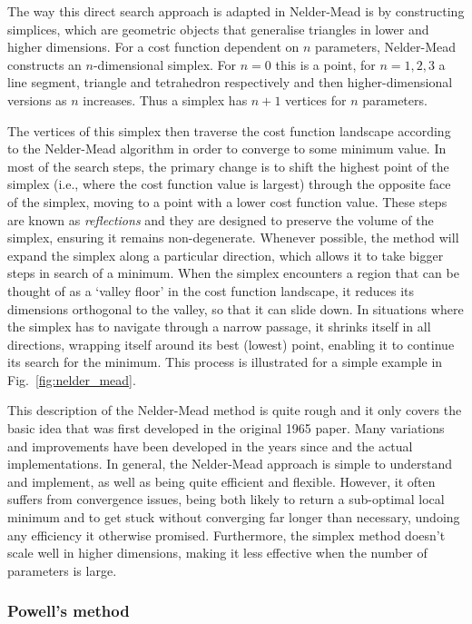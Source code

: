 The way this direct search approach is adapted in Nelder-Mead is by constructing simplices, which are geometric objects that generalise triangles in lower and higher dimensions. For a cost function dependent on $n$ parameters, Nelder-Mead constructs an $n$-dimensional simplex. For $n=0$ this is a point, for $n=1,2,3$ a line segment, triangle and tetrahedron respectively and then higher-dimensional versions as $n$ increases. Thus a simplex has $n+1$ vertices for $n$ parameters. 

The vertices of this simplex then traverse the cost function landscape according to the Nelder-Mead algorithm in order to converge to some minimum value.  In most of the search steps, the primary change is to shift the highest point of the simplex (i.e., where the cost function value is largest) through the opposite face of the simplex, moving to a point with a lower cost function value. These steps are known as \emph{reflections} and they are designed to preserve the volume of the simplex, ensuring it remains non-degenerate. Whenever possible, the method will expand the simplex along a particular direction, which allows it to take bigger steps in search of a minimum. When the simplex encounters a region that can be thought of as a `valley floor' in the cost function landscape, it reduces its dimensions orthogonal to the valley, so that it can slide down. In situations where the simplex has to navigate through a narrow passage, it shrinks itself in all directions, wrapping itself around its best (lowest) point, enabling it to continue its search for the minimum. This process is illustrated for a simple example in Fig.~\ref{fig:nelder_mead}.

This description of the Nelder-Mead method is quite rough and it only covers the basic idea that was first developed in the original 1965 paper. Many variations and improvements have been developed in the years since and the actual implementations. In general, the Nelder-Mead approach is simple to understand and implement, as well as being quite efficient and flexible. However, it often suffers from convergence issues, being both likely to return a sub-optimal local minimum and to get stuck without converging far longer than necessary, undoing any efficiency it otherwise promised. Furthermore, the simplex method doesn't scale well in higher dimensions, making it less effective when the number of parameters is large.

\subsubsection{Powell's method}\label{sec:3.1.3.2_Powell}

